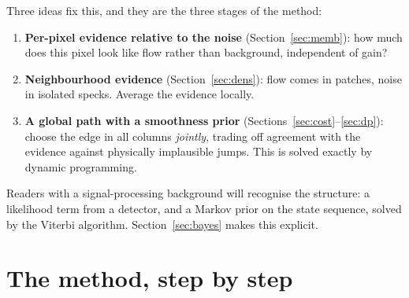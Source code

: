 \documentclass[11pt,a4paper]{article}
\begin{document}
Three ideas fix this, and they are the three stages of the method:
\begin{enumerate}
\item \textbf{Per-pixel evidence relative to the noise} (Section~\ref{sec:memb}): how much does this pixel look like
flow rather than background, independent of gain?
\item \textbf{Neighbourhood evidence} (Section~\ref{sec:dens}): flow comes in patches, noise in isolated specks.
Average the evidence locally.
\item \textbf{A global path with a smoothness prior} (Sections~\ref{sec:cost}--\ref{sec:dp}): choose the edge in all
columns \emph{jointly}, trading off agreement with the evidence against physically implausible jumps. This is solved
exactly by dynamic programming.
\end{enumerate}
Readers with a signal-processing background will recognise the structure: a likelihood term from a detector, and a
Markov prior on the state sequence, solved by the Viterbi algorithm. Section~\ref{sec:bayes} makes this explicit.

\part{The method, step by step}
\label{part:method}
\end{document}
